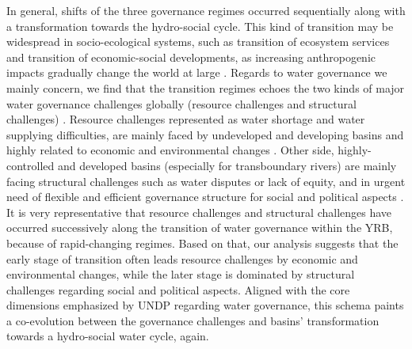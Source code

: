 \documentclass[9pt, twocolumn, twoside, lineno]{pnas-new}
\begin{document}
In general, shifts of the three governance regimes occurred sequentially along with a transformation towards the hydro-social cycle.
This kind of transition may be widespread in socio-ecological systems, such as transition of ecosystem services and transition of economic-social developments, as increasing anthropogenic impacts gradually change the world at large 
\cite{best2020,cummingLinkingEconomicGrowth2018,cummingImplicationsAgriculturalTransitions2014}.
Regards to water governance we mainly concern, we find that the transition regimes echoes the two kinds of major water governance challenges globally (resource challenges and structural challenges)
\cite{singh2019,porcher2019}.
Resource challenges represented as water shortage and water supplying difficulties, are mainly faced by undeveloped and developing basins and highly related to economic and environmental changes
\cite{allan2019,florke2018,liu2012}. 
Other side, highly-controlled and developed basins (especially for transboundary rivers) are mainly facing structural challenges such as water disputes or lack of equity, and in urgent need of flexible and efficient governance structure for social and political aspects
\cite{kitroeff2020,roobavannan2017,unep-dhi2016}.
It is very representative that resource challenges and structural challenges have occurred successively along the transition of water governance within the YRB, because of rapid-changing regimes.
Based on that, our analysis suggests that the early stage of transition often leads resource challenges by economic and environmental changes, while the later stage is dominated by structural challenges regarding social and political aspects.
Aligned with the core dimensions emphasized by UNDP regarding water governance, this schema paints a co-evolution between the governance challenges and basins' transformation towards a hydro-social water cycle, again. 
\end{document}
